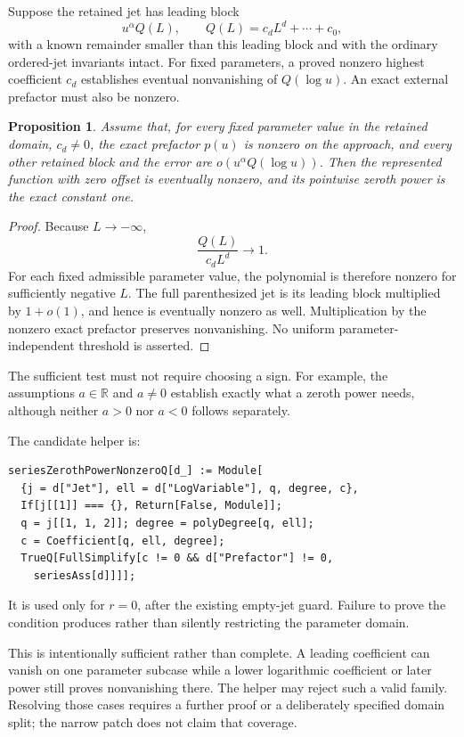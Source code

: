 \documentclass[11pt,letterpaper]{article}
\newcommand{\code}[1]{\texttt{\detokenize{#1}}}
\newtheorem{proposition}{Proposition}[section]
\begin{document}
Suppose the retained jet has leading block
\[
 u^\alpha Q(L),\qquad Q(L)=c_d L^d+\cdots+c_0,
\]
with a known remainder smaller than this leading block and with the ordinary ordered-jet invariants intact. For fixed parameters, a proved nonzero highest coefficient $c_d$ establishes eventual nonvanishing of $Q(\log u)$. An exact external prefactor must also be nonzero.

\begin{proposition}\label{prop:nonzero}
Assume that, for every fixed parameter value in the retained domain, $c_d\ne0$, the exact prefactor $p(u)$ is nonzero on the approach, and every other retained block and the error are $o(u^\alpha Q(\log u))$. Then the represented function with zero offset is eventually nonzero, and its pointwise zeroth power is the exact constant one.
\end{proposition}
\begin{proof}
Because $L\to-\infty$,
\[
 \frac{Q(L)}{c_dL^d}\longrightarrow1.
\]
For each fixed admissible parameter value, the polynomial is therefore nonzero for sufficiently negative $L$. The full parenthesized jet is its leading block multiplied by $1+o(1)$, and hence is eventually nonzero as well. Multiplication by the nonzero exact prefactor preserves nonvanishing. No uniform parameter-independent threshold is asserted.
\end{proof}

The sufficient test must not require choosing a sign. For example, the assumptions $a\in\mathbb R$ and $a\ne0$ establish exactly what a zeroth power needs, although neither $a>0$ nor $a<0$ follows separately.

The candidate helper is:
\begin{lstlisting}
seriesZerothPowerNonzeroQ[d_] := Module[
  {j = d["Jet"], ell = d["LogVariable"], q, degree, c},
  If[j[[1]] === {}, Return[False, Module]];
  q = j[[1, 1, 2]]; degree = polyDegree[q, ell];
  c = Coefficient[q, ell, degree];
  TrueQ[FullSimplify[c != 0 && d["Prefactor"] != 0,
    seriesAss[d]]]];
\end{lstlisting}
It is used only for $r=0$, after the existing empty-jet guard. Failure to prove the condition produces \code{Failure["UnprovedNonzeroBase", ...]} rather than silently restricting the parameter domain.

This is intentionally sufficient rather than complete. A leading coefficient can vanish on one parameter subcase while a lower logarithmic coefficient or later power still proves nonvanishing there. The helper may reject such a valid family. Resolving those cases requires a further proof or a deliberately specified domain split; the narrow patch does not claim that coverage.
\end{document}
